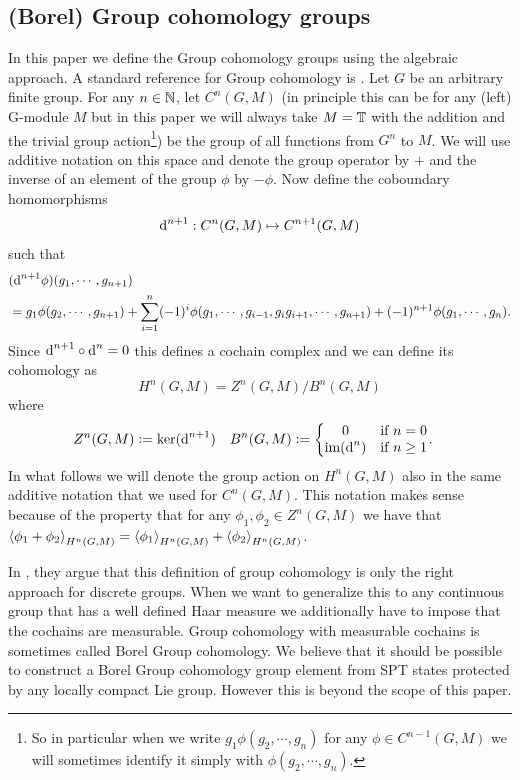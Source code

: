 \documentclass[12pt,a4paper,twoside]{article}
\numberwithin{equation}{section}
\begin{document}
\subsection{(Borel) Group cohomology groups}\label{sec:GroupCohomology}
In this paper we define the Group cohomology groups using the algebraic approach. A standard reference for Group cohomology is \cite{benson1991representations}. Let $G$ be an arbitrary finite group. For any $n\in\mathbb{N}$, let $C^n(G,M)$ (in principle this can be for any (left) G-module $M$ but in this paper we will always take $M=\mathbb T$ with the addition and the trivial group action\footnote{So in particular when we write $g_1 \phi(g_2,\cdots,g_n)$ for any $\phi\in C^{n-1}(G,M)$ we will sometimes identify it simply with $\phi(g_2,\cdots,g_n)$.}) be the group of all functions from $G^n$ to $M$. We will use additive notation on this space and denote the group operator by $+$ and the inverse of an element of the group $\phi$ by $-\phi$. Now define the coboundary homomorphisms
\begin{equation}
	\text{d}^{n+1}:C^n(G,M)\mapsto C^{n+1}(G,M)
\end{equation}
such that
\begin{align}
	\nonumber
	&(\text{d}^{n+1}\phi)(g_1,\cdots,g_{n+1})\\
	&=g_1\phi(g_2,\cdots,g_{n+1})+\sum_{i=1}^n (-1)^i \phi(g_1,\cdots,g_{i-1},g_{i}g_{i+1},\cdots,g_{n+1})+(-1)^{n+1}\phi(g_1,\cdots,g_n).
\end{align}
Since $\text{d}^{n+1}\circ\text{d}^{n}=0$ this defines a cochain complex and we can define its cohomology as
\begin{equation}
	H^n(G,M)=Z^n(G,M)/B^n(G,M)
\end{equation}
where
\begin{align}
	Z^n(G,M)&\defeq \ker(\d^{n+1})&B^n(G,M)&\defeq \left\{\begin{matrix}
	0&\text{if }n=0\\\textrm{im}(\d^n)&\text{if }n\geq 1
	\end{matrix}\right. .
\end{align}
In what follows we will denote the group action on $H^n(G,M)$ also in the same additive notation that we used for $C^n(G,M)$. This notation makes sense because of the property that for any $\phi_1,\phi_2\in Z^n(G,M)$ we have that $\expval{\phi_1+\phi_2}_{H^n(G,M)}=\expval{\phi_1}_{H^n(G,M)}+\expval{\phi_2}_{H^n(G,M)}$.
\begin{remark}
	In \cite{Chen_2013}, they argue that this definition of group cohomology is only the right approach for discrete groups. When we want to generalize this to any continuous group that has a well defined Haar measure we additionally have to impose that the cochains are measurable. Group cohomology with measurable cochains is sometimes called Borel Group cohomology. We believe that it should be possible to construct a Borel Group cohomology group element from SPT states protected by any locally compact Lie group. However this is beyond the scope of this paper.
\end{remark}
\end{document}
